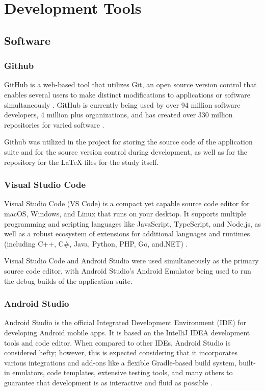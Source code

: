 \section{Development Tools}
\subsection{Software}

\subsubsection{Github}
GitHub is a web-based tool that utilizes Git, an open source version control that enables several users to make distinct modifications to applications or software simultaneously \cite{digitalGovGitHub}. GitHub is currently being used by over 94 million software developers, 4 million plus organizations, and has created over 330 million repositories for varied software \cite{github}. 

Github was utilized in the project for storing the source code of the application suite and for the source version control during development, as well as for the repository for the LaTeX files for the study itself.

\subsubsection{Visual Studio Code}
Visual Studio Code (VS Code) is a compact yet capable source code editor for macOS, Windows, and Linux that runs on your desktop. It supports multiple programming and scripting languages like JavaScript, TypeScript, and Node.js, as well as a robust ecosystem of extensions for additional languages and runtimes (including C++, C\#, Java, Python, PHP, Go, and.NET) \cite{microsoft_2021}.

Visual Studio Code and Android Studio were used simultaneously as the primary source code editor, with Android Studio's Android Emulator being used to run the debug builds of the application suite.  

\subsubsection{Android Studio}
Android Studio is the official Integrated Development Environment (IDE) for developing Android mobile apps. It is based on the IntelliJ IDEA development tools and code editor. When compared to other IDEs, Android Studio is considered hefty; however, this is expected considering that it incorporates various integrations and add-ons like a flexible Gradle-based build system, built-in emulators, code templates, extensive testing tools, and many others to guarantee that development is as interactive and fluid as possible \cite{androidStudio}.

